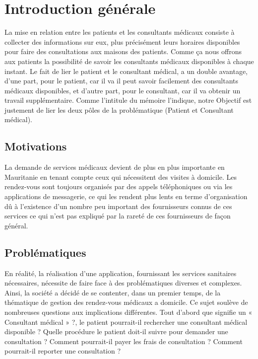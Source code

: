 \let\cleardoublepage\clearpage

\chapter{Introduction générale}
\label{sec:DescriptionDuProjet}


La mise en relation entre les patients et les consultants médicaux consiste à collecter des informations sur eux, plus précisément leurs horaires disponibles pour faire des consultations aux maisons des patients. Comme ça nous offrons aux patients la possibilité de savoir les consultants médicaux disponibles à chaque instant.
\newline\newline Le fait de lier le patient et le consultant médical, a un double avantage, d'une part, pour le patient, car il va il peut savoir facilement des consultants médicaux disponibles, et d'autre part, pour le consultant, car il va obtenir un travail supplémentaire. Comme l'intitule du mémoire l'indique, notre Objectif est justement de lier les deux pôles de la problématique (Patient et Consultant médical).

\section{Motivations}

La demande de services médicaux devient de plus en plus importante en Mauritanie en tenant compte ceux qui nécessitent des visites à domicile. Les rendez-vous sont toujours organisés par des appels téléphoniques ou via les applications de messagerie, ce qui les rendent plus lents en terme d'organisation dû à l'existence d'un nombre peu important des fournisseurs connus de ces services ce qui n'est pas expliqué par la rareté de ces fournisseurs de façon général.

\section{Problématiques}

En réalité, la réalisation d’une application, fournissant les services sanitaires nécessaires, nécessite de faire face à des problématiques diverses et complexes. Ainsi, la société a décidé de se contenter, dans un premier temps, de la thématique de gestion des rendez-vous médicaux a domicile. \newline
Ce sujet soulève de nombreuses questions aux implications différentes. Tout d'abord que signifie un « Consultant médical » ?, le patient pourrait-il rechercher une consultant médical disponible ? Quelle procédure le patient doit-il suivre pour demander une consultation ? Comment pourrait-il payer les frais de consultation ? Comment pourrait-il reporter une consultation ?


